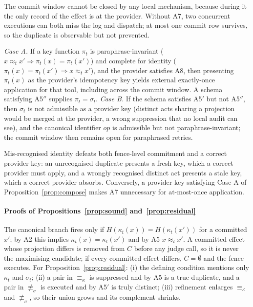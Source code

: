 The commit window cannot be closed by any local mechanism, because during it the only record of the effect is at the provider. Without A7, two concurrent executions can both miss the log and dispatch; at most one commit row survives, so the duplicate is observable but not prevented.

\begin{proposition}\label{prop:compose}
\emph{Case A.} If a key function $\pi_t$ is paraphrase-invariant ($x\approx_t x'\Rightarrow\pi_t(x)=\pi_t(x')$) and complete for identity ($\pi_t(x)=\pi_t(x')\Rightarrow x\approx_t x'$), and the provider satisfies A8, then presenting $\pi_t(x)$ as the provider's idempotency key yields external exactly-once application for that tool, including across the commit window. A schema satisfying A5$''$ supplies $\pi_t=\sigma_t$.
\emph{Case B.} If the schema satisfies A5$'$ but not A5$''$, then $\sigma_t$ is not admissible as a provider key (distinct acts sharing a projection would be merged at the provider, a wrong suppression that no local audit can see), and the canonical identifier $\mathit{op}$ is admissible but not paraphrase-invariant; the commit window then remains open for paraphrased retries.
\end{proposition}

\begin{proposition}\label{prop:structure}
Mis-recognised identity defeats both fence-level commitment and a correct provider key: an unrecognised duplicate presents a fresh key, which a correct provider must apply, and a wrongly recognised distinct act presents a stale key, which a correct provider absorbs. Conversely, a provider key satisfying Case A of Proposition~\ref{prop:compose} makes A7 unnecessary for at-most-once application.
\end{proposition}


\paragraph{Proofs of Propositions~\ref{prop:sound} and~\ref{prop:residual}}
The canonical branch fires only if $H(\kappa_t(x))=H(\kappa_t(x'))$ for a committed $x'$; by A2 this implies $\kappa_t(x)=\kappa_t(x')$ and by A5 $x\approx_t x'$. A committed effect whose projection differs is removed from $C$ before any judge call, so it is never the maximising candidate; if every committed effect differs, $C=\emptyset$ and the fence executes. For Proposition~\ref{prop:residual}: (i) the defining condition mentions only $\kappa_t$ and $\sigma_t$; (ii) a pair in $\equiv_\kappa$ is suppressed and by A5 is a true duplicate, and a pair in $\not\equiv_\sigma$ is executed and by A5$'$ is truly distinct; (iii) refinement enlarges $\equiv_\kappa$ and $\not\equiv_\sigma$, so their union grows and its complement shrinks.

